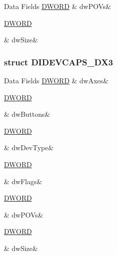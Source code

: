\begin{DoxyFields}{Data Fields}
\hypertarget{a00003_a658e41df851f944e49ab60307fd5ae13}{\hyperlink{a00003_a50e15ae51c87ae06ab29c8148cb5f36c}{D\-W\-O\-R\-D}}\label{a00003_a658e41df851f944e49ab60307fd5ae13}
&
dw\-P\-O\-Vs&
\\
\hline

\hypertarget{a00003_a669c5a85f5a9eb97e64ad880fadaaa2d}{\hyperlink{a00003_a50e15ae51c87ae06ab29c8148cb5f36c}{D\-W\-O\-R\-D}}\label{a00003_a669c5a85f5a9eb97e64ad880fadaaa2d}
&
dw\-Size&
\\
\hline

\end{DoxyFields}
\label{dc/ddf/a00067}
\hypertarget{a00003_dc/ddf/a00067}{}
\subsubsection{struct D\-I\-D\-E\-V\-C\-A\-P\-S\-\_\-\-D\-X3}
\begin{DoxyFields}{Data Fields}
\hypertarget{a00003_a24bf72ec9099cceba7f03c9d6c52ae11}{\hyperlink{a00003_a50e15ae51c87ae06ab29c8148cb5f36c}{D\-W\-O\-R\-D}}\label{a00003_a24bf72ec9099cceba7f03c9d6c52ae11}
&
dw\-Axes&
\\
\hline

\hypertarget{a00003_a2e6e5494aa77374c8c88d5ad03e86845}{\hyperlink{a00003_a50e15ae51c87ae06ab29c8148cb5f36c}{D\-W\-O\-R\-D}}\label{a00003_a2e6e5494aa77374c8c88d5ad03e86845}
&
dw\-Buttons&
\\
\hline

\hypertarget{a00003_a2bdaf065880c5cb7fa08be0bf17027a6}{\hyperlink{a00003_a50e15ae51c87ae06ab29c8148cb5f36c}{D\-W\-O\-R\-D}}\label{a00003_a2bdaf065880c5cb7fa08be0bf17027a6}
&
dw\-Dev\-Type&
\\
\hline

\hypertarget{a00003_a4d2f405b1141000eb2af256e0fc8b98b}{\hyperlink{a00003_a50e15ae51c87ae06ab29c8148cb5f36c}{D\-W\-O\-R\-D}}\label{a00003_a4d2f405b1141000eb2af256e0fc8b98b}
&
dw\-Flags&
\\
\hline

\hypertarget{a00003_a658e41df851f944e49ab60307fd5ae13}{\hyperlink{a00003_a50e15ae51c87ae06ab29c8148cb5f36c}{D\-W\-O\-R\-D}}\label{a00003_a658e41df851f944e49ab60307fd5ae13}
&
dw\-P\-O\-Vs&
\\
\hline

\hypertarget{a00003_a669c5a85f5a9eb97e64ad880fadaaa2d}{\hyperlink{a00003_a50e15ae51c87ae06ab29c8148cb5f36c}{D\-W\-O\-R\-D}}\label{a00003_a669c5a85f5a9eb97e64ad880fadaaa2d}
&
dw\-Size&
\\
\hline

\end{DoxyFields}
\label{da/d24/a00068}
\hypertarget{a00003_da/d24/a00068}{}
